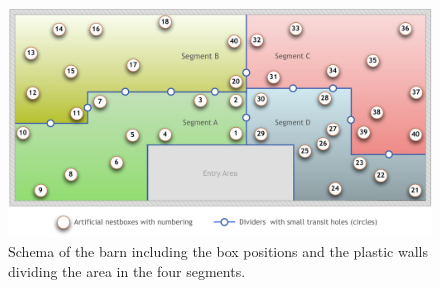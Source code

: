 \begin{figure}[htpb]
\begin{center}
  \includegraphics[width=\textwidth]{assets/pdf/shed_schema.pdf}
  \caption[Schema of the barn]{Schema of the barn including the box positions and the plastic walls dividing the area in the four segments. }
  \label{fig:shedschema}
\end{center}
\end{figure}